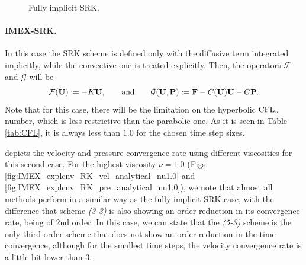 \begin{figure}[h!]
  \caption{Fully implicit SRK.}
  \label{fig-IMEX_implcnv_RK_analytical}
\end{figure}

\paragraph{IMEX-SRK.}

In this case the SRK scheme is defined only with the diffusive term integrated implicitly, while the convective one is treated explicitly. Then, the operators $\mathcal{F}$ and $\mathcal{G}$ will be
$$\mathcal{F}({\bf U}):=-K{\bf U},\quad\quad\mbox{and}\quad\quad\mathcal{G}({\bf U},{\bf P}):={\bf F}-C({\bf U}){\bf U}-G{\bf P}.$$
Note that for this case, there will be the limitation on the hyperbolic ${\rm CFL}_u$ number, which is less restrictive than the parabolic one. As it is seen in Table \ref{tab:CFL}, it is always less than $1.0$ for the chosen time step sizes.

 depicts the velocity and pressure convergence rate using different viscosities for this second case. 
For the highest viscosity $\nu=1.0$ (Figs. \ref{fig:IMEX_explcnv_RK_vel_analytical_nu1.0} and \ref{fig:IMEX_explcnv_RK_pre_analytical_nu1.0}), we note that almost all methods perform in a similar way as the fully implicit SRK case, with the difference that scheme \textit{(3-3)} is also showing an order reduction in its convergence rate, being of 2nd order. In this case, we can state that the \textit{(5-3)} scheme is the only third-order scheme that does not show an order reduction in the time convergence, although for the smallest time steps, the velocity convergence rate is a little bit lower than 3.

